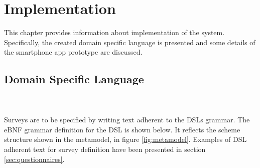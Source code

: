 \chapter{Implementation}
\label{chap:implementation}
This chapter provides information about implementation of the system. Specifically, the created domain specific language is presented and some details of the smartphone app prototype are discussed.

\section{Domain Specific Language}
\label{sec:dsl}
\pawel \\\\
Surveys are to be specified by writing text adherent to the DSLs grammar. The eBNF grammar definition for the DSL is shown below. It reflects the scheme structure shown in the metamodel, in figure \ref{fig:metamodel}. Examples of DSL adherent text for survey definition have been presented in section \ref{sec:questionnaires}.

